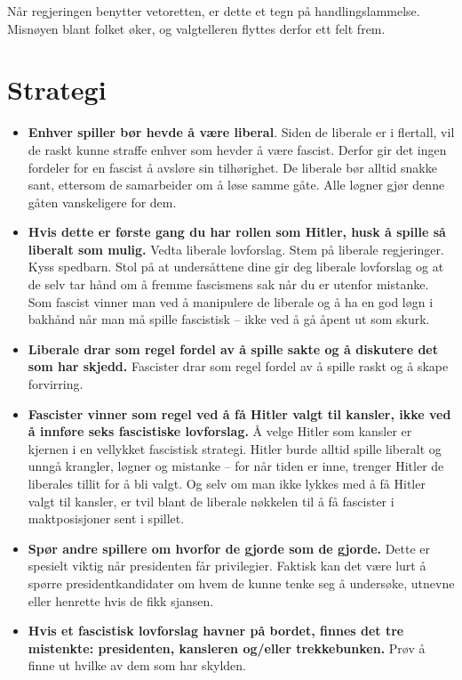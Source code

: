 \documentclass[a4paper, 10pt, twocolumn, twoside]{article}
\begin{document}
Når regjeringen benytter vetoretten, er dette et tegn på handlingslammelse. Misnøyen blant folket øker, og valgtelleren flyttes derfor ett felt frem.

\section{Strategi}
\begin{itemize}
    \item \textbf{Enhver spiller bør hevde å være liberal}. Siden de liberale er i flertall, vil de raskt kunne straffe enhver som hevder å være fascist. Derfor gir det ingen fordeler for en fascist å avsløre sin tilhørighet. De liberale bør alltid snakke sant, ettersom de samarbeider om å løse samme gåte. Alle løgner gjør denne gåten vanskeligere for dem.
    \item \textbf{Hvis dette er første gang du har rollen som Hitler, husk å spille så liberalt som mulig.} Vedta liberale lovforslag. Stem på liberale regjeringer. Kyss spedbarn. Stol på at undersåttene dine gir deg liberale lovforslag og at de selv tar hånd om å fremme fascismens sak når du er utenfor mistanke. Som fascist vinner man ved å manipulere de liberale og å ha en god løgn i bakhånd når man må spille fascistisk – ikke ved å gå åpent ut som skurk.
    \item \textbf{Liberale drar som regel fordel av å spille sakte og å diskutere det som har skjedd.} Fascister drar som regel fordel av å spille raskt og å skape forvirring.
    \item \textbf{Fascister vinner som regel ved å få Hitler valgt til kansler, ikke ved å innføre seks fascistiske lovforslag.} Å velge Hitler som kansler er kjernen i en vellykket fascistisk strategi. Hitler burde alltid spille liberalt og unngå krangler, løgner og mistanke – for når tiden er inne, trenger Hitler de liberales tillit for å bli valgt. Og selv om man ikke lykkes med å få Hitler valgt til kansler, er tvil blant de liberale nøkkelen til å få fascister i maktposisjoner sent i spillet.
    \item \textbf{Spør andre spillere om hvorfor de gjorde som de gjorde.} Dette er spesielt viktig når presidenten får privilegier. Faktisk kan det være lurt å spørre presidentkandidater om hvem de kunne tenke seg å undersøke, utnevne eller henrette hvis de fikk sjansen.
    \item \textbf{Hvis et fascistisk lovforslag havner på bordet, finnes det tre mistenkte: presidenten, kansleren og/eller trekkebunken.} Prøv å finne ut hvilke av dem som har skylden.
\end{itemize}
\end{document}

